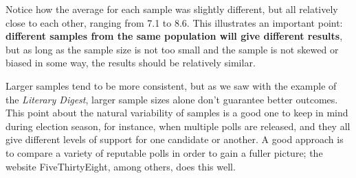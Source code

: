 Notice how the average for each sample was slightly different, but all relatively close to each other, ranging from 7.1 to 8.6.  This illustrates an important point: \textbf{different samples from the same population will give different results}, but as long as the sample size is not too small and the sample is not skewed or biased in some way, the results should be relatively similar.

Larger samples tend to be more consistent, but as we saw with the example of the \emph{Literary Digest}, larger sample sizes alone don't guarantee better outcomes.\\

This point about the natural variability of samples is a good one to keep in mind during election season, for instance, when multiple polls are released, and they all give different levels of support for one candidate or another.  A good approach is to compare a variety of reputable polls in order to gain a fuller picture; the website FiveThirtyEight, among others, does this well.